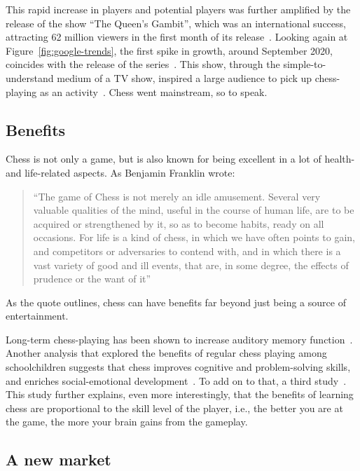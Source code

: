 This rapid increase in players and potential players was further amplified by the release of the show ``The Queen's
Gambit'', which was an international success, attracting 62 million viewers in the first month of its
release~\cite{deadline2020}.
Looking again at Figure~\ref{fig:google-trends}, the first spike in growth, around September 2020, coincides with the
release of the series~\cite{nyt2022}.
This show, through the simple-to-understand medium of a TV show, inspired a large audience to pick up chess-playing as
an activity~\cite{polygon2023}.
Chess went mainstream, so to speak.

\subsection{Benefits}\label{subsec:benefits}

Chess is not only a game, but is also known for being excellent in a lot of health- and life-related aspects.
As Benjamin Franklin wrote:~\blockcquote{franklin1786}{``The game of Chess is not merely an idle amusement. Several very
valuable qualities of the mind, useful in the course of human life, are to be acquired or strengthened by it, so as to
become habits, ready on all occasions. For life is a kind of chess, in which we have often points to gain, and
competitors or adversaries to contend with, and in which there is a vast variety of good and ill events, that are, in
some degree, the effects of prudence or the want of it''}.

As the quote outlines, chess can have benefits far beyond just being a source of entertainment.

Long-term chess-playing has been shown to increase auditory memory function~\cite{fattahi2015}.
Another analysis that explored the benefits of regular chess playing among schoolchildren suggests that chess improves
cognitive and problem-solving skills, and enriches social-emotional development~\cite{aciego2012}.
To add on to that, a third study~.
This study further explains, even more interestingly, that the benefits of learning chess are proportional to the skill
level of the player, i.e., the better you are at the game, the more your brain gains from the gameplay.

\subsection{A new market}\label{subsec:a-new-market}

